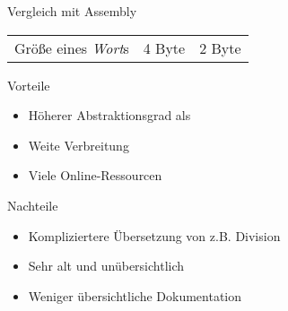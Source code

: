 \begin{frame}{Vergleich mit \riscv{} Assembly}
\begin{tabular}{l|l|l}
		Größe eines \emph{Wort}s   & 4 Byte                                                                                                                                                           & 2 Byte                                                                                                                                                                                                                                                                   \\
	\end{tabular}
\end{frame}

\begin{frame}{Vorteile}

    \begin{itemize}
        \item Höherer Abstraktionsgrad als \riscv{}
        \item Weite Verbreitung
        \item Viele Online-Ressourcen
    \end{itemize}
\end{frame}

\begin{frame}{Nachteile}

    \begin{itemize}
        \item Kompliziertere Übersetzung von z.B. Division 
        \item Sehr alt und unübersichtlich                 
        \item Weniger übersichtliche Dokumentation         
    \end{itemize}
\end{frame}
